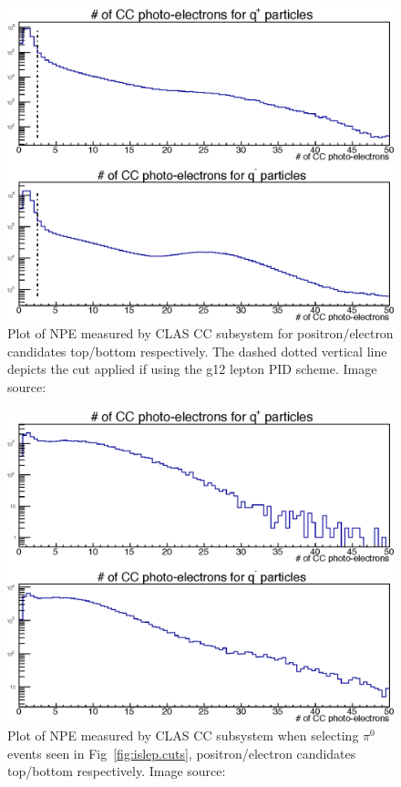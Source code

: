 %
\begin{figure}\begin{center}
		\includegraphics[width=0.8\figwidth]{figures/lepton/CC_nPE.eps}
		\caption[Number of Photo-electrons Measured by CC for All $e^-$ and $e^+$ Candidates]{\label{fig:islep.CC}Plot of NPE measured by CLAS CC subsystem for positron/electron candidates top/bottom respectively. The dashed dotted vertical line depicts the cut applied if using the g12 lepton PID scheme. Image source:~\cite{thesiskunkel}}
\end{center}\end{figure}
	
\begin{figure}\begin{center}
			\includegraphics[width=0.8\figwidth]{figures/lepton/CC_NPEcut.eps}
			\caption[Number of Photo-electrons Measured by CC for $\pi^0$ Events]{\label{fig:islep.CC1}Plot of NPE measured by CLAS CC subsystem when selecting $\pi^0$ events seen in Fig~\ref{fig:islep.cuts}, positron/electron candidates top/bottom respectively. Image source:~\cite{thesiskunkel}}
\end{center}\end{figure}
		
